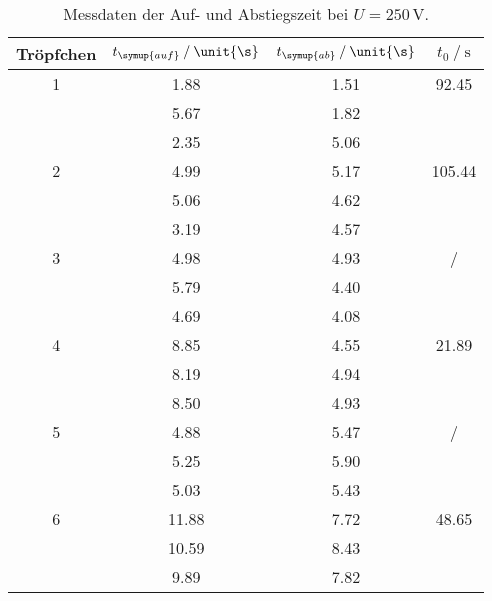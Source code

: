 \begin{table}
    \centering
    \caption{Messdaten der Auf- und Abstiegszeit bei $U=250\,\unit{\V}$.}
\begin{tabular}{c c c c}
    \toprule
        Tröpfchen &$t_{\symup{auf}} \mathbin{/} \unit{\s}$ & $t_{\symup{ab}}\mathbin{/} \unit{\s}$ & $t_0 \mathbin{/}\unit{\s}$ \\
    \midrule
    1&1.88&1.51&92.45 \\
    &5.67&1.82& \\
    &2.35&5.06& \\
2&4.99&5.17&105.44 \\
    &5.06&4.62& \\
    &3.19&4.57& \\
  3&4.98&4.93&/ \\
     &5.79&4.40& \\
    &4.69&4.08& \\
4&8.85&4.55&21.89 \\
    &8.19&4.94& \\
     &8.50&4.93& \\
  5&4.88&5.47&/ \\
     &5.25&5.90& \\
    &5.03&5.43& \\
6&11.88&7.72&48.65 \\
   &10.59&8.43& \\
    &9.89&7.82& \\
    \bottomrule
    \end{tabular}
    \label{tab:250}
\end{table}

